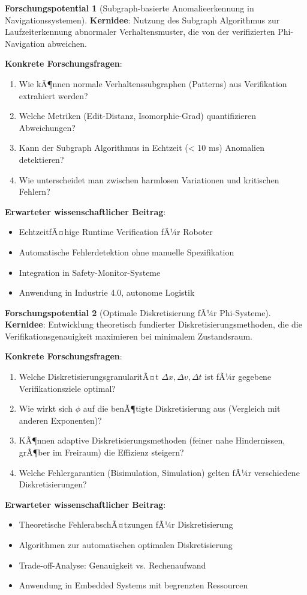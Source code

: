 ﻿\documentclass[a4paper,12pt]{article}
\theoremstyle{definition}
\newtheorem{potential}{Forschungspotential}[section]
\begin{document}
\begin{potential}[Subgraph-basierte Anomalieerkennung in Navigationssystemen]
\textbf{Kernidee}: Nutzung des Subgraph Algorithmus zur Laufzeiterkennung abnormaler Verhaltensmuster, die von der verifizierten Phi-Navigation abweichen.

\textbf{Konkrete Forschungsfragen}:
\begin{enumerate}
	\item Wie kÃ¶nnen normale Verhaltenssubgraphen (Patterns) aus Verifikation extrahiert werden?
	\item Welche Metriken (Edit-Distanz, Isomorphie-Grad) quantifizieren Abweichungen?
	\item Kann der Subgraph Algorithmus in Echtzeit (< 10 ms) Anomalien detektieren?
	\item Wie unterscheidet man zwischen harmlosen Variationen und kritischen Fehlern?
\end{enumerate}

\textbf{Erwarteter wissenschaftlicher Beitrag}:
\begin{itemize}
	\item EchtzeitfÃ¤hige Runtime Verification fÃ¼r Roboter
	\item Automatische Fehlerdetektion ohne manuelle Spezifikation
	\item Integration in Safety-Monitor-Systeme
	\item Anwendung in Industrie 4.0, autonome Logistik
\end{itemize}
\end{potential}

\begin{potential}[Optimale Diskretisierung fÃ¼r Phi-Systeme]
\textbf{Kernidee}: Entwicklung theoretisch fundierter Diskretisierungsmethoden, die die Verifikationsgenauigkeit maximieren bei minimalem Zustandsraum.

\textbf{Konkrete Forschungsfragen}:
\begin{enumerate}
	\item Welche DiskretisierungsgranularitÃ¤t $\Delta x, \Delta v, \Delta t$ ist fÃ¼r gegebene Verifikationsziele optimal?
	\item Wie wirkt sich $\phi$ auf die benÃ¶tigte Diskretisierung aus (Vergleich mit anderen Exponenten)?
	\item KÃ¶nnen adaptive Diskretisierungsmethoden (feiner nahe Hindernissen, grÃ¶ber im Freiraum) die Effizienz steigern?
	\item Welche Fehlergarantien (Bisimulation, Simulation) gelten fÃ¼r verschiedene Diskretisierungen?
\end{enumerate}

\textbf{Erwarteter wissenschaftlicher Beitrag}:
\begin{itemize}
	\item Theoretische FehlerabschÃ¤tzungen fÃ¼r Diskretisierung
	\item Algorithmen zur automatischen optimalen Diskretisierung
	\item Trade-off-Analyse: Genauigkeit vs. Rechenaufwand
	\item Anwendung in Embedded Systems mit begrenzten Ressourcen
\end{itemize}
\end{potential}
\end{document}
